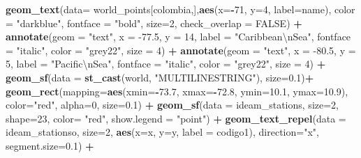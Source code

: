 \documentclass[12pt,oneside]{reedthesis}
\newenvironment{Shaded}{\begin{snugshade}}{\end{snugshade}}
\newcommand{\CharTok}[1]{\textcolor[rgb]{0.31,0.60,0.02}{#1}}
\newcommand{\DataTypeTok}[1]{\textcolor[rgb]{0.13,0.29,0.53}{#1}}
\newcommand{\DecValTok}[1]{\textcolor[rgb]{0.00,0.00,0.81}{#1}}
\newcommand{\FloatTok}[1]{\textcolor[rgb]{0.00,0.00,0.81}{#1}}
\newcommand{\KeywordTok}[1]{\textcolor[rgb]{0.13,0.29,0.53}{\textbf{#1}}}
\newcommand{\NormalTok}[1]{#1}
\newcommand{\OperatorTok}[1]{\textcolor[rgb]{0.81,0.36,0.00}{\textbf{#1}}}
\newcommand{\OtherTok}[1]{\textcolor[rgb]{0.56,0.35,0.01}{#1}}
\newcommand{\StringTok}[1]{\textcolor[rgb]{0.31,0.60,0.02}{#1}}
\begin{document}
\begin{Shaded}
\begin{Highlighting}[]
{{{{\StringTok{  }\KeywordTok{geom_text}\NormalTok{(}\DataTypeTok{data=}\NormalTok{ world_points[colombia,],}\KeywordTok{aes}\NormalTok{(}\DataTypeTok{x=}\OperatorTok{-}\DecValTok{71}\NormalTok{, }\DataTypeTok{y=}\DecValTok{4}\NormalTok{, }\DataTypeTok{label=}\NormalTok{name), }\DataTypeTok{color =} \StringTok{"darkblue"}\NormalTok{, }\DataTypeTok{fontface =} \StringTok{"bold"}\NormalTok{, }\DataTypeTok{size=}\DecValTok{2}\NormalTok{, }\DataTypeTok{check_overlap =} \OtherTok{FALSE}\NormalTok{) }\OperatorTok{+}
\StringTok{  }\KeywordTok{annotate}\NormalTok{(}\DataTypeTok{geom =} \StringTok{"text"}\NormalTok{, }\DataTypeTok{x =} \FloatTok{-77.5}\NormalTok{, }\DataTypeTok{y =} \DecValTok{14}\NormalTok{, }\DataTypeTok{label =} \StringTok{"Caribbean}\CharTok{\textbackslash{}n}\StringTok{Sea"}\NormalTok{, }\DataTypeTok{fontface =} \StringTok{"italic"}\NormalTok{, }\DataTypeTok{color =} \StringTok{"grey22"}\NormalTok{, }\DataTypeTok{size =} \DecValTok{4}\NormalTok{) }\OperatorTok{+}\StringTok{ }
\StringTok{  }\KeywordTok{annotate}\NormalTok{(}\DataTypeTok{geom =} \StringTok{"text"}\NormalTok{, }\DataTypeTok{x =} \FloatTok{-80.5}\NormalTok{, }\DataTypeTok{y =} \DecValTok{5}\NormalTok{, }\DataTypeTok{label =} \StringTok{"Pacific}\CharTok{\textbackslash{}n}\StringTok{Sea"}\NormalTok{, }\DataTypeTok{fontface =} \StringTok{"italic"}\NormalTok{, }\DataTypeTok{color =} \StringTok{"grey22"}\NormalTok{, }\DataTypeTok{size =} \DecValTok{4}\NormalTok{) }\OperatorTok{+}
\StringTok{  }\KeywordTok{geom_sf}\NormalTok{(}\DataTypeTok{data =} \KeywordTok{st_cast}\NormalTok{(world, }\StringTok{"MULTILINESTRING"}\NormalTok{), }\DataTypeTok{size=}\FloatTok{0.1}\NormalTok{)}\OperatorTok{+}
\StringTok{  }\KeywordTok{geom_rect}\NormalTok{(}\DataTypeTok{mapping=}\KeywordTok{aes}\NormalTok{(}\DataTypeTok{xmin=}\OperatorTok{-}\FloatTok{73.7}\NormalTok{, }\DataTypeTok{xmax=}\OperatorTok{-}\FloatTok{72.8}\NormalTok{, }\DataTypeTok{ymin=}\FloatTok{10.1}\NormalTok{, }\DataTypeTok{ymax=}\FloatTok{10.9}\NormalTok{), }\DataTypeTok{color=}\StringTok{"red"}\NormalTok{, }\DataTypeTok{alpha=}\DecValTok{0}\NormalTok{, }\DataTypeTok{size=}\FloatTok{0.1}\NormalTok{) }\OperatorTok{+}
\StringTok{  }\KeywordTok{geom_sf}\NormalTok{(}\DataTypeTok{data =}\NormalTok{ ideam_stations, }\DataTypeTok{size=}\DecValTok{2}\NormalTok{, }\DataTypeTok{shape=}\DecValTok{23}\NormalTok{, }\DataTypeTok{color=} \StringTok{"red"}\NormalTok{, }\DataTypeTok{show.legend =} \StringTok{"point"}\NormalTok{) }\OperatorTok{+}\StringTok{ }
\StringTok{  }\KeywordTok{geom_text_repel}\NormalTok{(}\DataTypeTok{data =}\NormalTok{ ideam_stationso, }\DataTypeTok{size=}\DecValTok{2}\NormalTok{, }\KeywordTok{aes}\NormalTok{(}\DataTypeTok{x=}\NormalTok{x, }\DataTypeTok{y=}\NormalTok{y, }\DataTypeTok{label =}\NormalTok{ codigo1), }\DataTypeTok{direction=}\StringTok{"x"}\NormalTok{, }\DataTypeTok{segment.size=}\FloatTok{0.1}\NormalTok{) }\OperatorTok{+}
}}}}
\end{Highlighting}
\end{Shaded}
\end{document}
